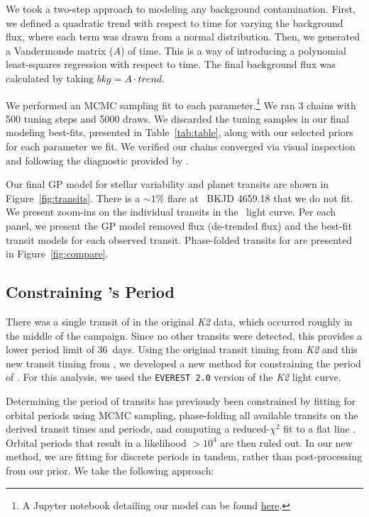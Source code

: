 \documentclass[twocolumn]{aastex631}
\begin{document}
We took a two-step approach to modeling any background contamination. First, we defined a quadratic trend with respect to time for varying the background flux, where each term was drawn from a normal distribution. Then, we generated a Vandermonde matrix ($A$) of time. This is a way of introducing a polynomial least-squares regression with respect to time. The final background flux was calculated by taking $bkg = A \cdot trend$.  

We performed an MCMC sampling fit to each parameter.\footnote{A Jupyter notebook detailing our model can be found \href{https:\/\/github.com\/afeinstein20\/v1298tau\_tess\/notebooks\/TESS\_V12989Tau.ipynb}{here}.} We ran 3 chains with 500 tuning steps and 5000 draws. We discarded the tuning samples in our final modeling best-fits, presented in Table~\ref{tab:table}, along with our selected priors for each parameter we fit. We verified our chains converged via visual inspection and following the diagnostic provided by \cite{Geweke92}.

Our final GP model for stellar variability and planet transits are shown in Figure~\ref{fig:transits}. There is a $\sim 1\%$ flare at \tess\ BKJD 4659.18 that we do not fit. We present zoom-ins on the individual transits in the \tess\ light curve. Per each panel, we present the GP model removed flux (de-trended flux) and the best-fit transit models for each observed transit. Phase-folded transits for \planetknown are presented in Figure~\ref{fig:compare}.


\subsection{Constraining \planete's Period}

There was a single transit of \planete in the original \textit{K2} data, which occurred roughly in the middle of the campaign. Since no other transits were detected, this provides a lower period limit of 36~days. Using the original transit timing from \textit{K2} and this new transit timing from \tess, we developed a new method for constraining the period of \planete. For this analysis, we used the \texttt{EVEREST 2.0} \citep{luger18} version of the \textit{K2} light curve. 

Determining the period of transits has previously been constrained by fitting for orbital periods using MCMC sampling, phase-folding all available transits on the derived transit times and periods, and computing a reduced-$\chi^2$ fit to a flat line \citep{becker19}. Orbital periods that result in a likelihood $> 10^4$ are then ruled out. In our new method, we are fitting for discrete periods in tandem, rather than post-processing from our prior. We take the following approach:
\end{document}
